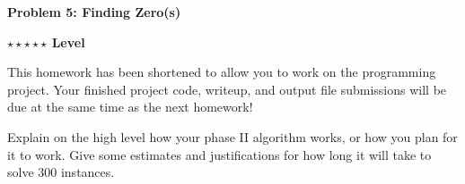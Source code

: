 \documentclass{article}\usepackage[utf8]{inputenc}\usepackage[margin=0.4cm,top=0.4cm,bottom=0.4cm]{geometry}\usepackage[usenames,dvipsnames,svgnames,table]{xcolor}
\begin{document}
\vspace{-2mm}\noindent\begin{mybox}{\begin{center}\textbf{\color{black}Problem 5: Finding Zero(s)}\end{center}}\end{mybox}\vspace{-2mm}
\begin{myboxot}\noindent\textbf{$\star\star\star\star\star$ Level}\end{myboxot} 

\noindent This homework has been shortened to allow you to work on the programming project. Your finished project
code, writeup, and output file submissions will be due at the same time as the next homework!

\vspace{4pt}\noindent Explain on the high level how your phase II algorithm works, or how you plan for it to work. Give some estimates and justifications for how long it will take to solve 300 instances.
\end{document}
